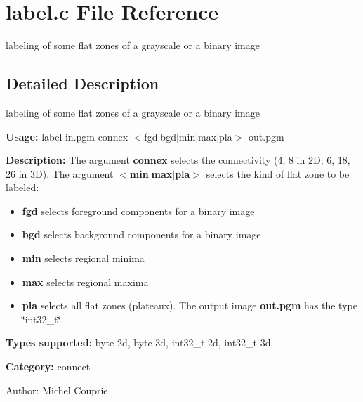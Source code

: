 \section{label.c File Reference}
\label{label_8c}
labeling of some flat zones of a grayscale or a binary image  




\label{_details}
\subsection{Detailed Description}
labeling of some flat zones of a grayscale or a binary image 

{\bf Usage:} label in.pgm connex $<$fgd$|$bgd$|$min$|$max$|$pla$>$ out.pgm

{\bf Description:} The argument {\bf connex} selects the connectivity (4, 8 in 2D; 6, 18, 26 in 3D). The argument {\bf $<$min$|$max$|$pla$>$} selects the kind of flat zone to be labeled: \begin{itemize}
\item {\bf fgd} selects foreground components for a binary image \item {\bf bgd} selects background components for a binary image \item {\bf min} selects regional minima \item {\bf max} selects regional maxima \item {\bf pla} selects all flat zones (plateaux). The output image {\bf out.pgm} has the type \char`\"{}int32\_\-t\char`\"{}.\end{itemize}
{\bf Types supported:} byte 2d, byte 3d, int32\_\-t 2d, int32\_\-t 3d

{\bf Category:} connect

\begin{Desc}
\item[Author:]Michel Couprie \end{Desc}
